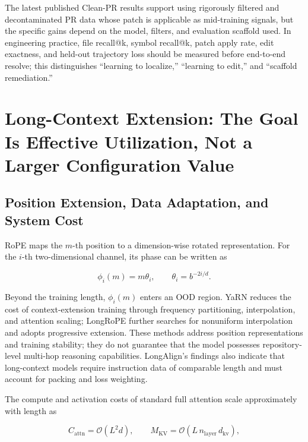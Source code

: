 \documentclass[10pt,a4paper,UTF8,fontset=none]{ctexart}
\newcommand{\metric}[1]{\textcolor{GoodGreen}{#1}}
\begin{document}
The latest published Clean-PR results support using rigorously filtered and decontaminated PR data whose patch is applicable as mid-training signals, but the specific gains depend on the model, filters, and evaluation scaffold used\cite{lo2026cleanpr}. In engineering practice, \metric{file recall@k}, \metric{symbol recall@k}, patch apply rate, edit exactness, and held-out trajectory loss should be measured before end-to-end resolve; this distinguishes ``learning to localize,'' ``learning to edit,'' and ``scaffold remediation.''

\section{Long-Context Extension: The Goal Is Effective Utilization, Not a Larger Configuration Value}

\subsection{Position Extension, Data Adaptation, and System Cost}

RoPE maps the $m$-th position to a dimension-wise rotated representation. For the $i$-th two-dimensional channel, its phase can be written as

\begin{equation}
\phi_i(m)=m\theta_i,\qquad \theta_i=b^{-2i/d}.
\label{eq:rope}
\end{equation}

Beyond the training length, $\phi_i(m)$ enters an OOD region. YaRN reduces the cost of context-extension training through frequency partitioning, interpolation, and attention scaling\cite{peng2023yarn}; LongRoPE further searches for nonuniform interpolation and adopts progressive extension\cite{ding2024longrope}. These methods address position representations and training stability; they do not guarantee that the model possesses repository-level multi-hop reasoning capabilities. LongAlign's findings also indicate that long-context models require instruction data of comparable length and must account for packing and loss weighting\cite{bai2024longalign}.

The compute and activation costs of standard full attention scale approximately with length as

\begin{equation}
C_{\mathrm{attn}}=\mathcal{O}(L^2 d),\qquad M_{\mathrm{KV}}=\mathcal{O}(L\,n_{\mathrm{layer}}\,d_{\mathrm{kv}}),
\label{eq:long-cost}
\end{equation}
\end{document}
